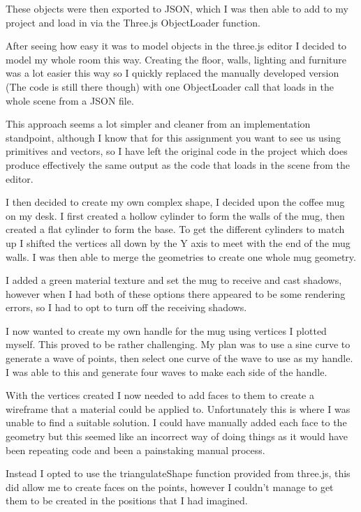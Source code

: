 \documentclass[runningheads,a4paper]{llncs}
\begin{document}
  These objects were then exported to JSON, which I was then able to add to my project and load in via the Three.js ObjectLoader function. 

  After seeing how easy it was to model objects in the three.js editor I decided to model my whole room this way. Creating the floor, walls, lighting and furniture was a lot easier this way so I quickly replaced the manually developed version (The code is still there though) with one ObjectLoader call that loads in the whole scene from a JSON file. 

  This approach seems a lot simpler and cleaner from an implementation standpoint, although I know that for this assignment you want to see us using primitives and vectors, so I have left the original code in the project which does produce effectively the same output as the code that loads in the scene from the editor. 

  I then decided to create my own complex shape, I decided upon the coffee mug on my desk. I first created a hollow cylinder to form the walls of the mug, then created a flat cylinder to form the base. To get the different cylinders to match up I shifted the vertices all down by the Y axis to meet with the end of the mug walls. I was then able to merge the geometries to create one whole mug geometry. 

  I added a green material texture and set the mug to receive and cast shadows, however when I had both of these options there appeared to be some rendering errors, so I had to opt to turn off the receiving shadows. 

  I now wanted to create my own handle for the mug using vertices I plotted myself. This proved to be rather challenging. My plan was to use a sine curve to generate a wave of points, then select one curve of the wave to use as my handle. I was able to this and generate four waves to make each side of the handle.

  With the vertices created I now needed to add faces to them to create a wireframe that a material could be applied to. Unfortunately this is where I was unable to find a suitable solution. I could have manually added each face to the geometry but this seemed like an incorrect way of doing things as it would have been repeating code and been a painstaking manual process. 

  Instead I opted to use the triangulateShape function provided from three.js, this did allow me to create faces on the points, however I couldn't manage to get them to be created in the positions that I had imagined. 
\end{document}
